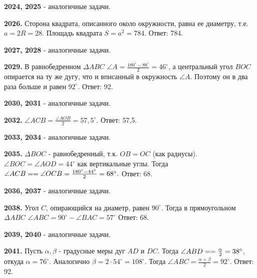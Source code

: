 \textbf{2024, 2025} - аналогичные задачи.

\textbf{2026.} Сторона квадрата, описанного около окружности, равна ее диаметру, т.е. $a = 2R = 28$. Площадь квадрата $S = a^2 = 784$. \newline \null \hspace*{\fill} Ответ: 784.

\clearpage 

\textbf{2027, 2028} - аналогичные задачи.

\textbf{2029.} В равнобедренном $\Delta ABC$ $\angle A = \frac{180^\circ - 88^\circ}{2} = 46^\circ$, а центральный угол $BOC$ опирается на ту же дугу, что и вписанный в окружность $\angle A$. Поэтому он в два раза больше и равен $92^\circ$. \newline \null \hspace*{\fill} Ответ: 92.

\textbf{2030, 2031} - аналогичные задачи.

\textbf{2032.} $\angle ACB = \frac{\angle AOB}{2} = 57,5^\circ$. \newline \null \hspace*{\fill} Ответ: 57,5.

\textbf{2033, 2034} - аналогичные задачи.

\textbf{2035.} $\Delta BOC$ - равнобедренный, т.к. $OB=OC$ (как радиусы). $\angle BOC = \angle AOD = 44^\circ$ как вертикальные углы. Тогда $\angle ACB = \linebreak = \angle OCB = \frac{180^\circ-44^\circ}{2} = 68^\circ.$ \newline \null \hspace*{\fill} Ответ: 68.

\textbf{2036, 2037} - аналогичные задачи.

\textbf{2038.} Угол $C$, опирающийся на диаметр, равен $90^\circ$. Тогда в прямоугольном $\Delta ABC$ $\angle ABC = 90^\circ - \angle BAC = 57^\circ$ \newline \null \hspace*{\fill} Ответ: 68.

\textbf{2039, 2040} - аналогичные задачи.

\textbf{2041.} Пусть $\alpha, \beta$ -  градусные меры дуг $AD$ и $DC$. Тогда $\angle ABD = \linebreak= \frac{\alpha}{2} = 38^\circ$, откуда $\alpha = 76^\circ$. Аналогично $\beta = 2 \cdot 54^\circ = 108^\circ$.
Тогда $\angle ABC = \frac{\alpha + \beta}{2} = 92^\circ$. \newline \null \hspace*{\fill} Ответ: 92.

